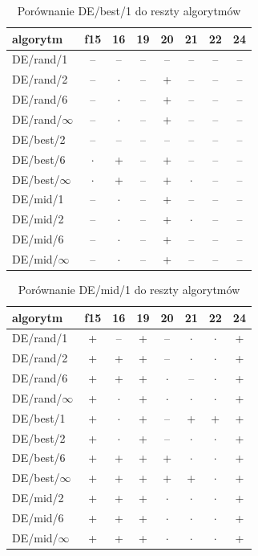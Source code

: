 \documentclass[a4paper,onecolumn,oneside,11pt,wide,floatssmall]{mwrep}
\theoremstyle{definition}
\theoremstyle{plain}%
\theoremstyle{remark}
\begin{document}
\begin{table}[H]
\centering
\begin{tabular}{ l | c | c | c | c | c | c | c }
algorytm         &f15& 16& 19& 20& 21& 22& 24 \\ \hline
DE/rand/1	 & -- & -- & -- & -- & -- & -- & -- \\
DE/rand/2	 & -- & $\cdot$ & -- & + & -- & -- & -- \\
DE/rand/6	 & -- & $\cdot$ & -- & + & -- & -- & -- \\
DE/rand/$\infty$	 & -- & $\cdot$ & -- & + & -- & -- & -- \\
DE/best/2	 & -- & -- & -- & -- & -- & -- & -- \\
DE/best/6	 & $\cdot$ & + & -- & + & -- & -- & -- \\
DE/best/$\infty$	 & $\cdot$ & + & -- & + & $\cdot$ & -- & -- \\
DE/mid/1	 & -- & $\cdot$ & -- & + & -- & -- & -- \\
DE/mid/2	 & -- & $\cdot$ & -- & + & $\cdot$ & -- & -- \\
DE/mid/6	 & -- & $\cdot$ & -- & + & -- & -- & -- \\
DE/mid/$\infty$	 & -- & $\cdot$ & -- & + & -- & -- & -- \\
\end{tabular}
\caption{Porównanie DE/best/1 do reszty algorytmów}
\end{table}

\begin{table}[H]
\centering
\begin{tabular}{ l | c | c | c | c | c | c | c }
algorytm         &f15& 16& 19& 20& 21& 22& 24 \\ \hline
DE/rand/1	 & + & -- & + & -- & $\cdot$ & $\cdot$ & + \\
DE/rand/2	 & + & + & + & -- & $\cdot$ & $\cdot$ & + \\
DE/rand/6	 & + & + & + & $\cdot$ & -- & $\cdot$ & + \\
DE/rand/$\infty$	 & + & $\cdot$ & + & $\cdot$ & $\cdot$ & $\cdot$ & + \\
DE/best/1	 & + & $\cdot$ & + & -- & + & + & + \\
DE/best/2	 & + & $\cdot$ & + & -- & $\cdot$ & $\cdot$ & + \\
DE/best/6	 & + & + & + & + & $\cdot$ & $\cdot$ & + \\
DE/best/$\infty$	 & + & + & + & + & + & $\cdot$ & + \\
DE/mid/2	 & + & + & + & $\cdot$ & $\cdot$ & $\cdot$ & + \\
DE/mid/6	 & + & + & + & $\cdot$ & $\cdot$ & $\cdot$ & + \\
DE/mid/$\infty$	 & + & + & + & $\cdot$ & $\cdot$ & $\cdot$ & + \\
\end{tabular}
\caption{Porównanie DE/mid/1 do reszty algorytmów}
\end{table}
\end{document}
